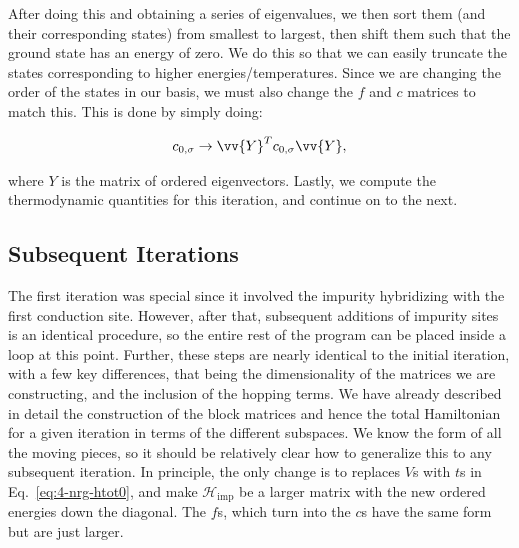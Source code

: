 After doing this and obtaining a series of eigenvalues, we then sort them (and their corresponding states) from smallest to largest, then shift them such that the ground state has an energy of zero. We do this so that we can easily truncate the states corresponding to higher energies/temperatures. Since we are changing the order of the states in our basis, we must also change the $f$ and $c$ matrices to match this. This is done by simply doing:

\begin{equation}
  c_{0,\sigma} \rightarrow \vv{Y}^T c_{0,\sigma} \vv{Y},
\end{equation}

where $Y$ is the matrix of ordered eigenvectors. Lastly, we compute the thermodynamic quantities for this iteration, and continue on to the next.


\subsection{Subsequent Iterations}

The first iteration was special since it involved the impurity hybridizing with the first conduction site. However, after that, subsequent additions of impurity sites is an identical procedure, so the entire rest of the program can be placed inside a loop at this point. Further, these steps are nearly identical to the initial iteration, with a few key differences, that being the dimensionality of the matrices we are constructing, and the inclusion of the hopping terms. We have already described in detail the construction of the block matrices and hence the total Hamiltonian for a given iteration in terms of the different subspaces. We know the form of all the moving pieces, so it should be relatively clear how to generalize this to any subsequent iteration. In principle, the only change is to replaces $V$s with $t$s in Eq.~\eqref{eq:4-nrg-htot0}, and make $\mathcal{H}_{\mathrm{imp}}$ be a larger matrix with the new ordered energies down the diagonal. The $f$s, which turn into the $c$s have the same form but are just larger.










